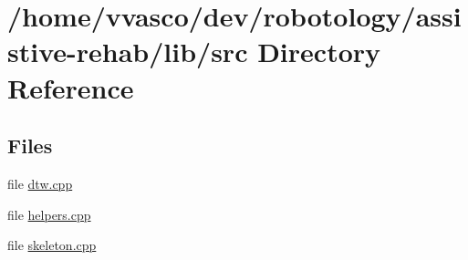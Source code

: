 \section{/home/vvasco/dev/robotology/assistive-\/rehab/lib/src Directory Reference}
\label{dir_a065c5f60305fee3569f887679366939}
\subsection*{Files}
\begin{DoxyCompactItemize}
\item 
file \hyperlink{dtw_8cpp}{dtw.\+cpp}
\item 
file \hyperlink{helpers_8cpp}{helpers.\+cpp}
\item 
file \hyperlink{skeleton_8cpp}{skeleton.\+cpp}
\end{DoxyCompactItemize}
